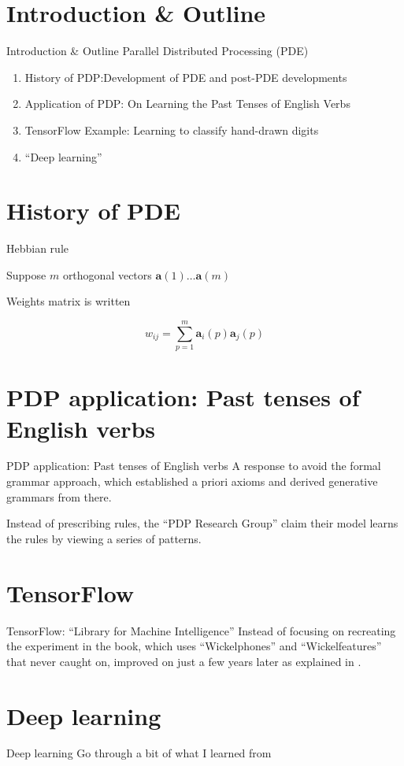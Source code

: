 \documentclass{beamer}
\begin{document}
\section{Introduction \& Outline}
\begin{frame}{Introduction \& Outline}
    Parallel Distributed Processing (PDE)
    \begin{enumerate}
        \item History of PDP:\@ Development of PDE and post-PDE developments
        \item Application of PDP: On Learning the Past Tenses of English Verbs
        \item TensorFlow Example: Learning to classify hand-drawn digits
        \item ``Deep learning''
    \end{enumerate}
\end{frame}

\section{History of PDE}
\begin{frame}{Hebbian rule}

    Suppose \(m\) orthogonal vectors \(\mathbf{a}(1) \ldots \mathbf{a}(m)\)

    Weights matrix is written 

    \begin{equation}
        w_{ij} = \sum_{p=1}^m \mathbf{a}_i(p) \mathbf{a}_j(p)
    \end{equation}

\end{frame}

\section{PDP application: Past tenses of English verbs}
\begin{frame}{PDP application: Past tenses of English verbs}
    A response to avoid the formal grammar approach,
    which established a priori axioms and derived generative grammars
    from there.

    Instead of prescribing rules, the ``PDP Research Group'' claim their model
    learns the rules by viewing a series of patterns.
\end{frame}

\section{TensorFlow}
\begin{frame}{TensorFlow: ``Library for Machine Intelligence''}
    Instead of focusing on recreating the experiment in the book, which
    uses ``Wickelphones'' and ``Wickelfeatures'' that never caught on,
    improved on just a few years later as explained in .
\end{frame}

\section{Deep learning}
\begin{frame}{Deep learning}
    Go through a bit of what I learned from 
\end{frame}
\end{document}
